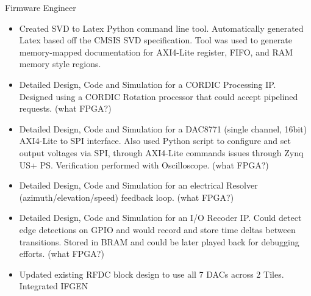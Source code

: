 \documentclass[10pt,final,sans]{resume}
\begin{document}
Firmware Engineer
\begin{itemize}
  \item Created SVD to Latex Python command line tool. Automatically generated Latex based off the CMSIS SVD specification. Tool was used to generate memory-mapped documentation for AXI4-Lite register, FIFO, and RAM memory style regions.
  \item Detailed Design, Code and Simulation for a CORDIC Processing IP. Designed using a CORDIC Rotation processor that could accept pipelined requests. (what FPGA?)
  \item Detailed Design, Code and Simulation for a DAC8771 (single channel, 16bit) AXI4-Lite to SPI interface. Also used Python script to configure and set output voltages via SPI, through AXI4-Lite commands issues through Zynq US+ PS. Verification performed with Oscilloscope. (what FPGA?)
  \item Detailed Design, Code and Simulation for an electrical Resolver (azimuth/elevation/speed) feedback loop. (what FPGA?)
  \item Detailed Design, Code and Simulation for an I/O Recoder IP. Could detect edge detections on GPIO and would record and store time deltas between transitions. Stored in BRAM and could be later played back for debugging efforts. (what FPGA?)
  \item Updated existing RFDC block design to use all 7 DACs across 2 Tiles. Integrated IFGEN
\end{itemize}

\end{document}
